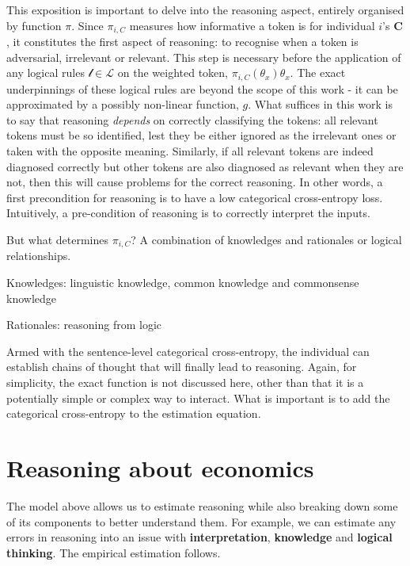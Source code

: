 \documentclass[
]{article}
\begin{document}
This exposition is important to delve into the reasoning aspect,
entirely organised by function \(\pi\). Since \(\pi_{i, C}\) measures
how informative a token is for individual \(i\)'s \(\mathbf{C}\), it
constitutes the first aspect of reasoning: to recognise when a token is
adversarial, irrelevant or relevant. This step is necessary before the
application of any logical rules \(\mathcal{l} \in \mathcal{L}\) on the
weighted token, \(\pi_{i, C}(\theta_x) \theta_x\). The exact
underpinnings of these logical rules are beyond the scope of this work -
it can be approximated by a possibly non-linear function, \(g\). What
suffices in this work is to say that reasoning \emph{depends} on
correctly classifying the tokens: all relevant tokens must be so
identified, lest they be either ignored as the irrelevant ones or taken
with the opposite meaning. Similarly, if all relevant tokens are indeed
diagnosed correctly but other tokens are also diagnosed as relevant when
they are not, then this will cause problems for the correct reasoning.
In other words, a first precondition for reasoning is to have a low
categorical cross-entropy loss. Intuitively, a pre-condition of
reasoning is to correctly interpret the inputs.

But what determines \(\pi_{i, C}\)? A combination of knowledges and
rationales or logical relationships.

Knowledges: linguistic knowledge, common knowledge and commonsense
knowledge

Rationales: reasoning from logic

Armed with the sentence-level categorical cross-entropy, the individual
can establish chains of thought that will finally lead to reasoning.
Again, for simplicity, the exact function is not discussed here, other
than that it is a potentially simple or complex way to interact. What is
important is to add the categorical cross-entropy to the estimation
equation.

\section{Reasoning about economics}\label{reasoning-about-economics}

The model above allows us to estimate reasoning while also breaking down
some of its components to better understand them. For example, we can
estimate any errors in reasoning into an issue with
\textbf{interpretation}, \textbf{knowledge} and \textbf{logical
thinking}. The empirical estimation follows.
\end{document}
